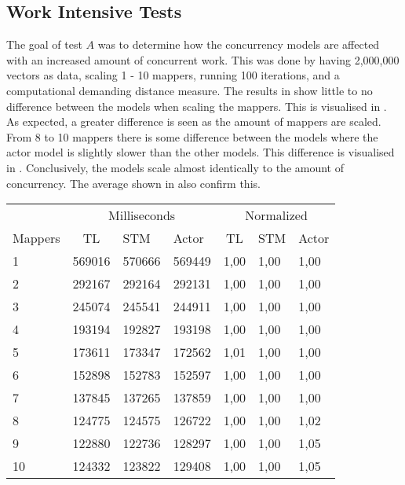 \subsection{Work Intensive Tests}
The goal of test $A$ was to determine how the concurrency models are affected with an increased amount of concurrent work. This was done by having 2,000,000 vectors as data, scaling 1 - 10 mappers, running 100 iterations, and a computational demanding distance measure. The results in  show little to no difference between the models when scaling the mappers. This is visualised in . As expected, a greater difference is seen as the amount of mappers are scaled. From 8 to 10 mappers there is some difference between the models where the actor model is slightly slower than the other models. This difference is visualised in . Conclusively, the models scale almost identically to the amount of concurrency. The average shown in  also confirm this.
%
\begin{center}
\begin{table}[h]
\centering
\begin{tabular}{l|cll|cll}
             & \multicolumn{3}{c|}{Milliseconds} & \multicolumn{3}{c}{Normalized} \\
Mappers & TL     & STM     & Actor     & TL      & STM      & Actor     \\ \hline
1   &   569016	  &      570666      &    569449	&  1,00   & 1,00 &    1,00    \\
2   &   292167      &      292164      &    292131  &  1,00   & 1,00 &    1,00    \\
3   &   245074      &      245541      &    244911  &  1,00   & 1,00 &    1,00    \\
4   &   193194      &      192827      &    193198  &  1,00   & 1,00 &    1,00    \\
5   &   173611      &      173347      &    172562  &  1,01   & 1,00 &    1,00    \\
6   &   152898      &      152783      &    152597  &  1,00   & 1,00 &    1,00    \\
7   &   137845      &      137265      &    137859  &  1,00   & 1,00 &    1,00    \\
8   &   124775      &      124575      &    126722  &  1,00   & 1,00 &    1,02    \\
9   &   122880      &      122736      &    128297  &  1,00   & 1,00 &    1,05    \\
10 &   124332      &      123822      &    129408  &  1,00   & 1,00 &    1,05    \\
\end{tabular}
\label{table:test_results_a}
\end{table}
\end{center}
